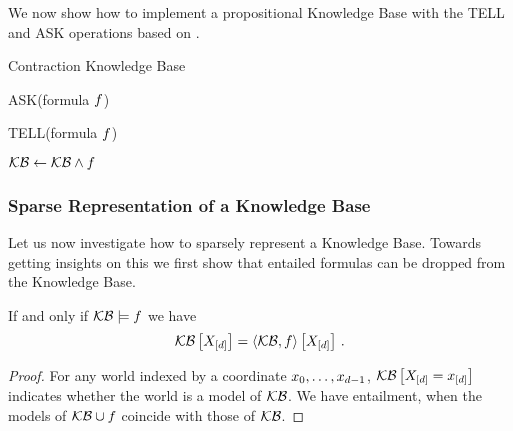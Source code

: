 We now show how to implement a propositional Knowledge Base with the TELL and ASK operations based on .

\begin{algorithm}[hbt!]
\caption{Contraction Knowledge Base}\label{alg:TensorKB}
ASK(formula $f$)
\begin{algorithmic}
	\State{$\hypercoreat{\formulavar} \algdefsymbol \sbcontractionof{\kb,\rencodingof{\exformula}}{\formulavar}$}
	\EndIf
	\EndIf
\end{algorithmic}
TELL(formula $f$)
\begin{algorithmic}
	\State $\mathcal{KB} \leftarrow \mathcal{KB}\land f$%
	\EndIf
\end{algorithmic}

\end{algorithm}




\subsubsection{Sparse Representation of a Knowledge Base}

Let us now investigate how to sparsely represent a Knowledge Base.
Towards getting insights on this we first show that entailed formulas can be dropped from the Knowledge Base.

\begin{theorem}\label{the:ReduncancyOfEntailed}
	If and only if $\mathcal{KB} \models f$ we have
		\[ \mathcal{KB}\left[X_{[d]}\right]= \left\langle \mathcal{KB},f\right\rangle \left[ X_{[d]} \right]  \, . \]
\end{theorem}
\begin{proof}
	For any world indexed by a coordinate ${x_{0},\ldots,x_{d-1}}$, $\mathcal{KB}\left[X_{[d]}=x_{[d]}\right]$ indicates whether the world is a model of $\mathcal{KB}$.
	We have entailment, when the models of $\mathcal{KB}\cup f$ coincide with those of $\mathcal{KB}$.
\end{proof}


